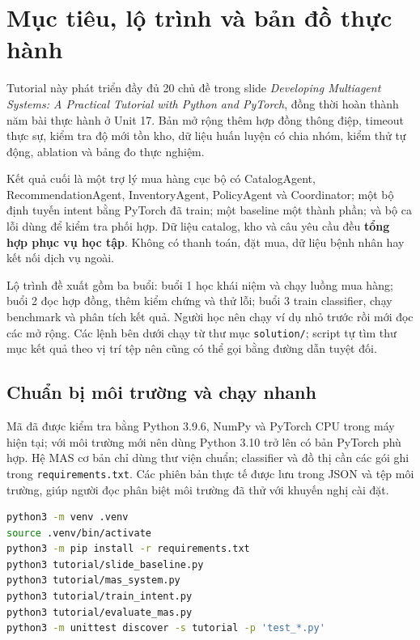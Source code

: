 \section{Mục tiêu, lộ trình và bản đồ thực
hành}\label{mux1ee5c-tiuxeau-lux1ed9-truxecnh-vuxe0-bux1ea3n-ux111ux1ed3-thux1ef1c-huxe0nh}

Tutorial này phát triển đầy đủ 20 chủ đề trong slide \emph{Developing
Multiagent Systems: A Practical Tutorial with Python and PyTorch}, đồng
thời hoàn thành năm bài thực hành ở Unit 17. Bản mở rộng thêm hợp đồng
thông điệp, timeout thực sự, kiểm tra độ mới tồn kho, dữ liệu huấn luyện
có chia nhóm, kiểm thử tự động, ablation và bảng đo thực nghiệm.
\cite{slides}

Kết quả cuối là một trợ lý mua hàng cục bộ có CatalogAgent,
RecommendationAgent, InventoryAgent, PolicyAgent và Coordinator; một bộ
định tuyến intent bằng PyTorch đã train; một baseline một thành phần; và
bộ ca lỗi dùng để kiểm tra phối hợp. Dữ liệu catalog, kho và câu yêu cầu
đều \textbf{tổng hợp phục vụ học tập}. Không có thanh toán, đặt mua, dữ
liệu bệnh nhân hay kết nối dịch vụ ngoài.

Lộ trình đề xuất gồm ba buổi: buổi 1 học khái niệm và chạy luồng mua
hàng; buổi 2 đọc hợp đồng, thêm kiểm chứng và thử lỗi; buổi 3 train
classifier, chạy benchmark và phân tích kết quả. Người học nên chạy ví
dụ nhỏ trước rồi mới đọc các mở rộng. Các lệnh bên dưới chạy từ thư mục
\passthrough{\lstinline!solution/!}; script tự tìm thư mục kết quả theo
vị trí tệp nên cũng có thể gọi bằng đường dẫn tuyệt đối.

\subsection{Chuẩn bị môi trường và chạy
nhanh}\label{chuux1ea9n-bux1ecb-muxf4i-trux1b0ux1eddng-vuxe0-chux1ea1y-nhanh}

Mã đã được kiểm tra bằng Python 3.9.6, NumPy và PyTorch CPU trong máy
hiện tại; với môi trường mới nên dùng Python 3.10 trở lên có bản PyTorch
phù hợp. Hệ MAS cơ bản chỉ dùng thư viện chuẩn; classifier và đồ thị cần
các gói ghi trong \passthrough{\lstinline!requirements.txt!}. Các phiên
bản thực tế được lưu trong JSON và tệp môi trường, giúp người đọc phân
biệt môi trường đã thử với khuyến nghị cài đặt.

\begin{lstlisting}[language=sh]
python3 -m venv .venv
source .venv/bin/activate
python3 -m pip install -r requirements.txt
python3 tutorial/slide_baseline.py
python3 tutorial/mas_system.py
python3 tutorial/train_intent.py
python3 tutorial/evaluate_mas.py
python3 -m unittest discover -s tutorial -p 'test_*.py'
\end{lstlisting}

